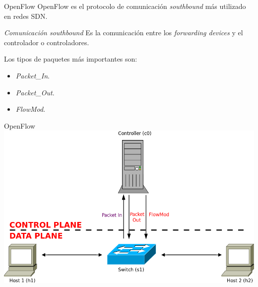 \documentclass{beamer}
\begin{document}
\begin{frame}{OpenFlow}
   OpenFlow es el protocolo de comunicación \textit{southbound} más utilizado en redes SDN. \vspace{10pt}
   \begin{block}{\textit{Comunicación southbound}}
        Es la comunicación entre los \textit{forwarding devices} y el controlador o controladores.
   \end{block}\vspace{10pt}
   
    Los tipos de paquetes más importantes son: 
    \begin{itemize}
        \item \textit{Packet\_In}.
        \item \textit{Packet\_Out}.
        \item \textit{FlowMod}.
    \end{itemize}
\end{frame}

\begin{frame}{OpenFlow}
    \centering
    \includegraphics[scale=0.33]{SDN_flowmod.png}
\end{frame}
\end{document}
